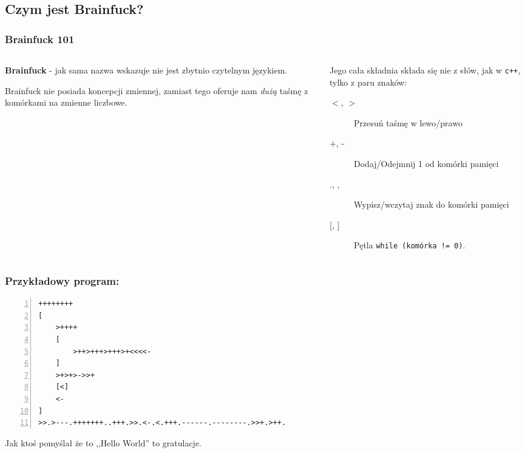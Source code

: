 \documentclass[aspectratio=169]{beamer}
\begin{document}
\subsection{Czym jest Brainfuck?}
\begin{frame}[fragile]
    \frametitle{Brainfuck 101}
    \begin{columns}
        \begin{column}{0.5\textwidth}
            \textbf{Brainfuck} - jak sama nazwa wskazuje nie jest zbytnio czytelnym językiem.

            Brainfuck nie posiada koncepcji zmiennej, zamiast tego oferuje nam \emph{dużą} taśmę z komórkami na zmienne liczbowe.


        \end{column}
        \begin{column}{.5\textwidth}
            Jego cała składnia składa się nie z słów, jak w \texttt{c++}, tylko z paru znaków:

            \begin{description}
                \item[{$<$}, {$>$}] Przesuń taśmę w lewo/prawo
                \item[+, -] Dodaj/Odejmnij 1 od komórki pamięci
                \item[., ,] Wypisz/wczytaj znak do komórki pamięci
                \item[{[, ]}] Pętla \texttt{while~(komórka~!=~0)}.
            \end{description}
        \end{column}
    \end{columns}
\end{frame}
\begin{frame}[fragile]
    \frametitle{Przykładowy program:}
    \begin{lstlisting}[frame=L,basicstyle=\footnotesize\ttfamily,numbers=left]
++++++++
[
    >++++
    [
        >++>+++>+++>+<<<<-
    ]
    >+>+>->>+
    [<]
    <-
]
>>.>---.+++++++..+++.>>.<-.<.+++.------.--------.>>+.>++.
            \end{lstlisting}
    \pause
    Jak ktoś pomyślał że to ,,Hello World'' to gratulacje.
\end{frame}
\end{document}
